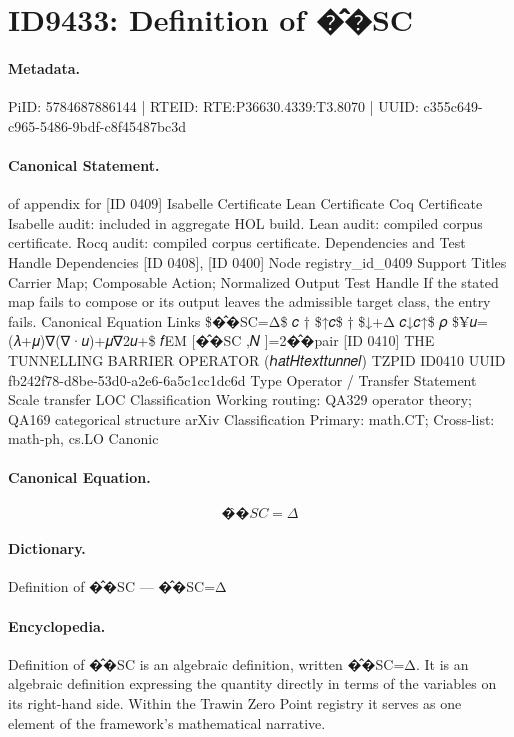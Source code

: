 \section*{ID9433: Definition of �̂�SC}
\paragraph{Metadata.}
PiID: 5784687886144 | RTEID: RTE:P36630.4339:T3.8070 | UUID: c355c649-c965-5486-9bdf-c8f45487bc3d

\paragraph{Canonical Statement.}
of appendix for [ID 0409] Isabelle Certificate Lean Certificate Coq Certificate Isabelle audit: included in aggregate HOL build. Lean audit: compiled corpus certificate. Rocq audit: compiled corpus certificate. Dependencies and Test Handle Dependencies [ID 0408], [ID 0400] Node registry\_id\_0409 Support Titles Carrier Map; Composable Action; Normalized Output Test Handle If the stated map fails to compose or its output leaves the admissible target class, the entry fails. Canonical Equation Links \$�̂�SC=Δ\$ 𝑐 † \$↑𝑐\$ † \$↓+Δ 𝑐↓𝑐↑\$ 𝜌 \$¥𝑢=(𝜆+𝜇)∇(∇·𝑢)+𝜇∇2𝑢+\$ 𝑓EM [�̂�SC ,𝑁 ]=2�̂�pair [ID 0410] THE TUNNELLING BARRIER OPERATOR (ℎ𝑎𝑡𝐻𝑡𝑒𝑥𝑡𝑡𝑢𝑛𝑛𝑒𝑙) TZPID ID0410 UUID fb242f78-d8be-53d0-a2e6-6a5c1cc1dc6d Type Operator / Transfer Statement Scale transfer LOC Classification Working routing: QA329 operator theory; QA169 categorical structure arXiv Classification Primary: math.CT; Cross-list: math-ph, cs.LO Canonic

\paragraph{Canonical Equation.}
\[
�̂�SC=Δ
\]

\paragraph{Dictionary.}
Definition of �̂�SC — �̂�SC=Δ

\paragraph{Encyclopedia.}
Definition of �̂�SC is an algebraic definition, written �̂�SC=Δ. It is an algebraic definition expressing the quantity directly in terms of the variables on its right-hand side. Within the Trawin Zero Point registry it serves as one element of the framework's mathematical narrative.
